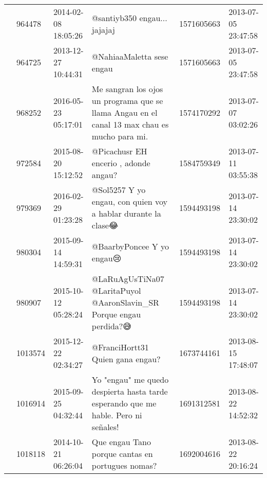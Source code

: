 \begin{tabular}{llllrl}
           & 964478  & 2014-02-08 18:05:26 &                                                                                                                 @santiyb350 engau... jajajaj &  1571605663 & 2013-07-05 23:47:58 \\
           & 964725  & 2013-12-27 10:44:31 &                                                                                                                    @NahiaaMaletta sese engau &  1571605663 & 2013-07-05 23:47:58 \\
           & 968252  & 2016-05-23 05:17:01 &                                                 Me sangran los ojos un programa que se llama Angau en el canal 13 max chau es mucho para mi. &  1574170292 & 2013-07-07 03:02:26 \\
           & 972584  & 2015-08-20 15:12:52 &                                                                                                        @Picachusr EH encerio , adonde angau? &  1584759349 & 2013-07-11 03:55:38 \\
           & 979369  & 2016-02-29 01:23:28 &                                                                                @Sol5257 Y yo engau, con quien voy a hablar durante la clase😂 &  1594493198 & 2013-07-14 23:30:02 \\
           & 980304  & 2015-09-14 14:59:31 &                                                                                                                    @BaarbyPoncee Y yo engau😢 &  1594493198 & 2013-07-14 23:30:02 \\
           & 980907  & 2015-10-12 05:28:24 &                                                                          @LaRuAgUsTiNa07 @LaritaPuyol @AaronSlavin\_SR Porque engau perdida?😅 &  1594493198 & 2013-07-14 23:30:02 \\
           & 1013574 & 2015-12-22 02:34:27 &                                                                                                             @FranciHortt31 Quien gana engau? &  1673744161 & 2013-08-15 17:48:07 \\
           & 1016914 & 2015-09-25 04:32:44 &                                                           Yo "engau" me quedo despierta hasta tarde esperando que me hable. Pero ni señales! &  1691312581 & 2013-08-22 14:52:32 \\
           & 1018118 & 2014-10-21 06:26:04 &                                                                                             Que engau Tano porque cantas en portugues nomas? &  1692004616 & 2013-08-22 20:16:24 \\

\end{tabular}
